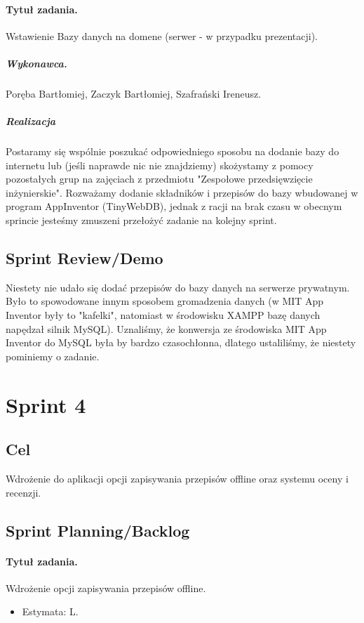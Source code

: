 \documentclass[a4paper]{article}
\begin{document}
	
	\paragraph{Tytuł zadania.} Wstawienie Bazy danych na domene (serwer - w przypadku prezentacji).
	\subparagraph{Wykonawca.} Poręba Bartłomiej, Zaczyk Bartłomiej, Szafrański Ireneusz.
	\subparagraph{Realizacja}
	Postaramy się wspólnie poszukać odpowiedniego sposobu na dodanie bazy do internetu lub (jeśli naprawde nic nie znajdziemy) skożystamy z pomocy pozostałych grup na zajęciach z przedmiotu "Zespołowe przedsięwzięcie inżynierskie". Rozważamy dodanie składników i przepisów do bazy wbudowanej w program AppInventor (TinyWebDB), jednak z racji na brak czasu w obecnym sprincie jesteśmy zmuszeni przełożyć zadanie na kolejny sprint.
	
	
	\subsection{Sprint Review/Demo}
	Niestety nie udało się dodać przepisów do bazy danych na serwerze prywatnym. Było to spowodowane innym sposobem gromadzenia danych (w MIT App Inventor były to "kafelki", natomiast w środowisku XAMPP bazę danych napędzał silnik MySQL). Uznaliśmy, że konwersja ze środowiska MIT App Inventor do MySQL była by bardzo czasochłonna, dlatego ustaliliśmy, że niestety pominiemy o zadanie.
	
	\section{Sprint 4}
	
	\subsection{Cel} Wdrożenie do aplikacji opcji zapisywania przepisów offline oraz systemu oceny i recenzji.
	
	\subsection{Sprint Planning/Backlog}
	
	\paragraph{Tytuł zadania.} Wdrożenie opcji zapisywania przepisów offline.
	\begin{itemize}
		\item Estymata: L.
	\end{itemize}
	
\end{document}
